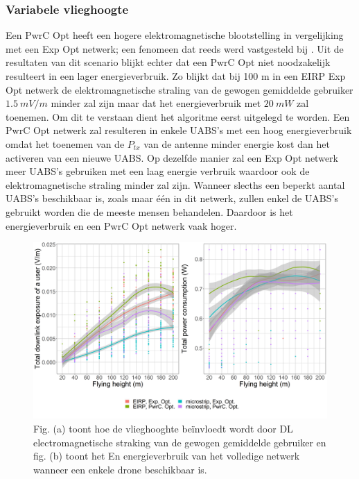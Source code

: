 \documentclass[twocolumn]{phdsymp_dutch}
\begin{document}
\subsubsection{Variabele vlieghoogte}
Een \gls{PwrC Opt} heeft een hogere elektromagnetische blootstelling in vergelijking met een
 \gls{Exp Opt} netwerk; een fenomeen dat reeds werd vastgesteld bij \cite{J1}. 
Uit de resultaten van dit scenario blijkt echter dat een
\gls{PwrC Opt} niet noodzakelijk resulteert in een lager energieverbruik.
Zo blijkt dat bij 100 m in een  \gls{EIRP} \gls{Exp Opt} netwerk
 de elektromagnetische straling van de gewogen gemiddelde gebruiker
 $1.5\ mV/m$ minder zal zijn maar dat het energieverbruik met $20\ mW$ zal toenemen.
Om dit te verstaan dient het algoritme eerst uitgelegd te worden.
Een  \gls{PwrC Opt} netwerk zal resulteren in enkele \gls{UABS}'s met een hoog energieverbruik 
omdat het toenemen van de $P_{tx}$ van de antenne minder energie kost dan het activeren van een nieuwe \gls{UABS}.
Op dezelfde manier zal een \gls{Exp Opt} netwerk meer \gls{UABS}'s gebruiken met een laag energie verbruik waardoor ook de elektromagnetische straling minder zal zijn.
Wanneer slecths een beperkt aantal \gls{UABS}'s beschikbaar is, zoals maar \'e\'en in dit netwerk, 
zullen enkel de \gls{UABS}'s gebruikt worden die de meeste mensen behandelen.
Daardoor is het energieverbruik en een \gls{PwrC Opt} netwerk vaak hoger.


\begin{figure}[h!]
  \includegraphics[width=\linewidth]{s2/fhvsdlAndPc.png}
  \caption{Fig. (a) toont hoe de vlieghooghte be\"invloedt wordt door \acs{DL} electromagnetische straking van de 
  gewogen gemiddelde gebruiker en fig. (b) toont het En energieverbruik van het volledige netwerk wanneer een enkele drone beschikbaar is.}
  \label{fig:s2a_dlAndPc}
\end{figure}
\end{document}
